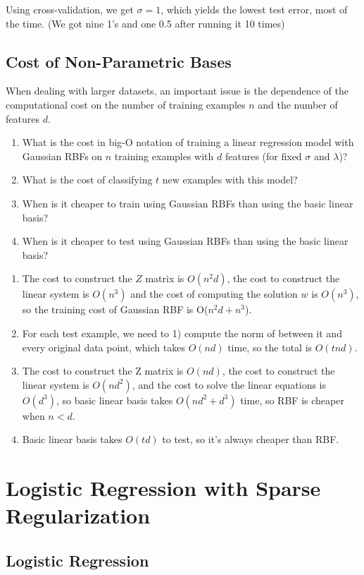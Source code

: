 \documentclass{article}
\def\blu#1{{\color{blu}#1}}
\def\enum#1{\begin{enumerate}#1\end{enumerate}}
\begin{document}
Using cross-validation, we get $\sigma = 1$, which yields the lowest test error, most of the time. (We got nine 1's and one 0.5 after running it 10 times)


\subsection{Cost of Non-Parametric Bases}

When dealing with larger datasets, an important issue is the dependence of the computational cost on the number of training examples $n$ and the number of features $d$. 
\blu{
\enum{
\item What is the cost in big-O notation of training a linear regression model with Gaussian RBFs on $n$ training examples with $d$ features (for fixed $\sigma$ and $\lambda$)? 
\item What is the cost of classifying $t$ new examples with this model? 
\item When is it cheaper to train using Gaussian RBFs than using the basic linear basis? 
\item When is it cheaper to test using Gaussian RBFs than using the basic linear basis?
}}

\enum{
\item  The cost to construct the $Z$ matrix is $O(n^2d)$, the cost to construct the linear system is $O(n^3)$ and the cost of computing the solution $w$ is $O(n^3)$, so the training cost of Gaussian RBF is O($n^2d+n^3$).
\item For each test example, we need to 1) compute the norm of between it and every original data point, which takes $O(nd)$ time, so the total is $O(tnd)$.
\item  The cost to construct the Z matrix is $O(nd)$, the cost to construct the linear system is $O(nd^2)$, and the cost to solve the linear equations is $O(d^3)$, so basic linear basis takes $O(nd^2 + d^3)$ time, so RBF is cheaper when $ n < d$.
 \item  Basic linear basis takes $O(td)$ to test, so it's always cheaper than RBF.
}



\section{Logistic Regression with Sparse Regularization}

\subsection{Logistic Regression}
\end{document}
